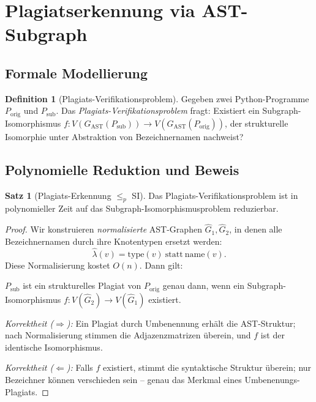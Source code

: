 ﻿\documentclass[a4paper,12pt]{article}
\theoremstyle{definition}
\newtheorem{definition}{Definition}
\newtheorem{satz}{Satz}
\begin{document}
\section{Plagiats\-erkennung via AST-Subgraph}
\label{sec:plagiat}

\subsection{Formale Modellierung}

\begin{definition}[Plagiats-Verifikationsproblem]
Gegeben zwei Python-Programme $P_{\mathrm{orig}}$ und
$P_{\mathrm{sub}}$.  Das \emph{Plagiats-Verifikationsproblem}
fragt: Existiert ein Subgraph-Isomorphismus
$f\colon V(G_{\mathrm{AST}}(P_{\mathrm{sub}})) \to
V(G_{\mathrm{AST}}(P_{\mathrm{orig}}))$, der strukturelle
Isomorphie unter Abstraktion von Bezeichnernamen nachweist?
\end{definition}

\subsection{Polynomielle Reduktion und Beweis}

\begin{satz}[Plagiats-Erkennung $\leq_p$ SI]
\label{satz:plagiat}
Das Plagiats-Verifikationsproblem ist in polynomieller Zeit
auf das Subgraph-Isomorphismusproblem reduzierbar.
\end{satz}

\begin{proof}
Wir konstruieren \emph{normalisierte} AST-Graphen
$\hat{G}_1, \hat{G}_2$, in denen alle Bezeichnernamen durch
ihre Knotentypen ersetzt werden:
\[
\hat{\lambda}(v) = \mathrm{type}(v)\ \text{statt}\ \mathrm{name}(v).
\]
Diese Normalisierung kostet $O(n)$.  Dann gilt:

$P_{\mathrm{sub}}$ ist ein strukturelles Plagiat von
$P_{\mathrm{orig}}$ genau dann, wenn ein Subgraph-Isomorphismus
$f\colon V(\hat{G}_2) \to V(\hat{G}_1)$ existiert.

\emph{Korrektheit ($\Rightarrow$):} Ein Plagiat durch
Umbenennung erh\"alt die AST-Struktur; nach Normalisierung
stimmen die Adjazenzmatrizen \"uberein, und $f$ ist der
identische Isomorphismus.

\emph{Korrektheit ($\Leftarrow$):} Falls $f$ existiert,
stimmt die syntaktische Struktur \"uberein; nur Bezeichner
k\"onnen verschieden sein -- genau das Merkmal eines
Umbenenungs-Plagiats.
\end{proof}
\end{document}
